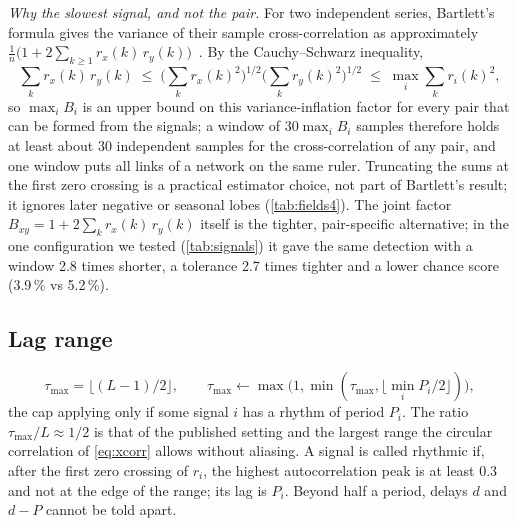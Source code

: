 \documentclass[11pt,a4paper]{article}
\begin{document}
\emph{Why the slowest signal, and not the pair.} For two independent series, Bartlett's formula gives the variance of their sample cross-correlation as approximately $\frac{1}{n}\big(1 + 2\sum_{k\ge1} r_x(k)\,r_y(k)\big)$~\cite{Bartlett1946TheoreticalSpecification}. By the Cauchy--Schwarz inequality,
\begin{equation}
\textstyle\sum_k r_x(k)\,r_y(k) \;\le\; \big(\sum_k r_x(k)^2\big)^{1/2}\big(\sum_k r_y(k)^2\big)^{1/2} \;\le\; \max_i \sum_k r_i(k)^2 ,
\end{equation}
so $\max_i B_i$ is an upper bound on this variance-inflation factor for every pair that can be formed from the signals; a window of $30\max_i B_i$ samples therefore holds at least about 30 independent samples for the cross-correlation of any pair, and one window puts all links of a network on the same ruler. Truncating the sums at the first zero crossing is a practical estimator choice, not part of Bartlett's result; it ignores later negative or seasonal lobes (\cref{tab:fields4}). The joint factor $B_{xy} = 1 + 2\sum_k r_x(k)\,r_y(k)$ itself is the tighter, pair-specific alternative; in the one configuration we tested (\cref{tab:signals}) it gave the same detection with a window 2.8 times shorter, a tolerance 2.7 times tighter and a lower chance score (3.9\,\% vs 5.2\,\%).

\subsection{Lag range}
\label{sec:lag}
\begin{equation}
\tau_{\max} = \big\lfloor (L-1)/2 \big\rfloor, \qquad \tau_{\max} \leftarrow \max\!\big(1, \min(\tau_{\max}, \lfloor \min_i P_i / 2 \rfloor)\big),
\end{equation}
the cap applying only if some signal $i$ has a rhythm of period $P_i$.
The ratio $\tau_{\max} / L \approx 1/2$ is that of the published setting and the largest range the circular correlation of \cref{eq:xcorr} allows without aliasing. A signal is called rhythmic if, after the first zero crossing of $r_i$, the highest autocorrelation peak is at least 0.3 and not at the edge of the range; its lag is $P_i$. Beyond half a period, delays $d$ and $d - P$ cannot be told apart.
\end{document}
